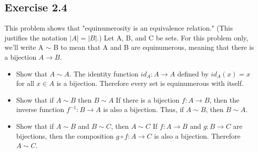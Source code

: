 \documentclass[12pt]{article}
\begin{document}
		\subsection*{Exercise 2.4}
			This problem shows that "equinumerosity is an equivalence relation." (This justifies the notation $|A| = |B|$.) Let A, B, and C be sets. For this problem only, we'll write A $\sim$ B to mean that A and B are equinumerous, meaning that there is a bijection $A \rightarrow B$.
			\begin{itemize}
				\item Show that $A \sim A$.
					The identity function $id_A: A \rightarrow A$ defined by $id_A(x) = x$ for all $x \in A$ is a bijection. Therefore every set is equinumerous with itself.
				\item Show that if $A \sim B$ then $B \sim A$
					If there is a bijection $f:A \rightarrow B$, then the inverse function $f^{-1}: B \rightarrow A$ is also a bijection. Thus, if $A \sim B$, then $B \sim A$.
				\item Show that if $A \sim B$ and $B \sim C$, then $A \sim C$
					If $f:A \rightarrow B$ and $g:B \rightarrow C$ are bijections, then the composition $g \circ f: A \rightarrow C$ is also a bijection. Therefore $A \sim C$.
			\end{itemize}
\end{document}
